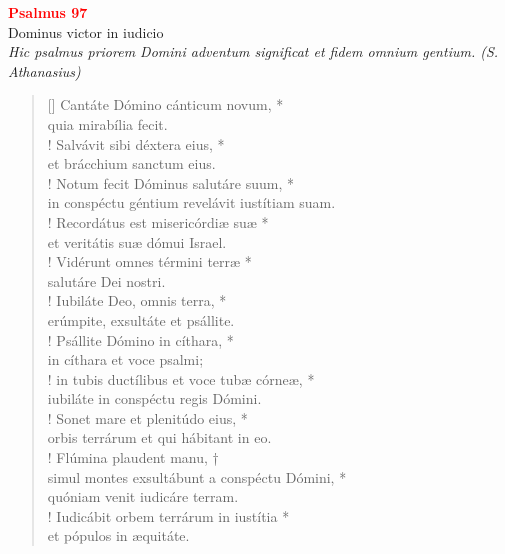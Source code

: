 


\def\greinitialformat#1{%
{\fontsize{39}{39}\selectfont #1}%
}




\vspace{0.3cm}
\begin{center}
 \textcolor{red}{\large \bf Psalmus 97}\\
Dominus victor in iudicio\\
\textit{\small Hic psalmus priorem Domini adventum significat et fidem omnium gentium. (S. Athanasius)}
\end{center}
\begin{verse}[\versewidth]
Cantáte Dómino cánticum novum, *\\
quia mirabília fecit.\\!
\vin Salvávit sibi déxtera eius, *\\
\vin et brácchium sanctum eius.\\!
Notum fecit Dóminus salutáre suum, *\\
in conspéctu géntium revelávit iustítiam suam.\\!
\vin Recordátus est misericórdiæ suæ *\\
\vin et veritátis suæ dómui Israel.\\!
Vidérunt omnes términi terræ *\\
salutáre Dei nostri.\\!
\vin Iubiláte Deo, omnis terra, *\\
\vin erúmpite, exsultáte et psállite.\\!
Psállite Dómino in cíthara, *\\
in cíthara et voce psalmi;\\!
\vin in tubis ductílibus et voce tubæ córneæ, *\\
\vin iubiláte in conspéctu regis Dómini.\\!
Sonet mare et plenitúdo eius, *\\
orbis terrárum et qui hábitant in eo.\\!
\vin Flúmina plaudent manu, †\\
\vin simul montes exsultábunt a conspéctu Dómini, *\\
\vin quóniam venit iudicáre terram.\\!
Iudicábit orbem terrárum in iustítia *\\
et pópulos in æquitáte.\\
\end{verse}
\vspace{1cm}


